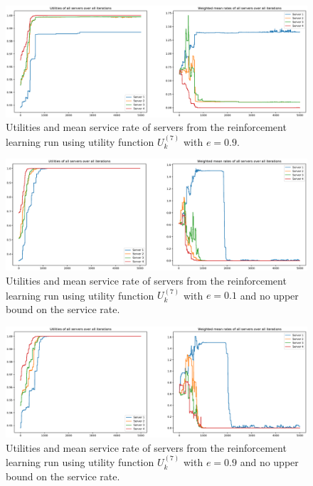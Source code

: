 \begin{figure}[H]
    \includegraphics[width=\textwidth]{chapters/00_appendix/03_more_rl_results/Bin/utility_7_eps/u7_4_e09.eps}
    \caption{Utilities and mean service rate of servers from the reinforcement
    learning run using utility function \(U_k^{(7)}\) with \(e = 0.9\).}
    \label{fig:RL_utility7_4_e09}
\end{figure}


\begin{figure}[H]
    \includegraphics[width=\textwidth]{chapters/00_appendix/03_more_rl_results/Bin/utility_7_eps/u7_5_no_max_e01.eps}
    \caption{Utilities and mean service rate of servers from the reinforcement
    learning run using utility function \(U_k^{(7)}\) with \(e = 0.1\) and no
    upper bound on the service rate.}
    \label{fig:RL_utility7_5_no_max_e01}
\end{figure}

\begin{figure}[H]
    \includegraphics[width=\textwidth]{chapters/00_appendix/03_more_rl_results/Bin/utility_7_eps/u7_5_no_max_e09.eps}
    \caption{Utilities and mean service rate of servers from the reinforcement
    learning run using utility function \(U_k^{(7)}\) with \(e = 0.9\) and no
    upper bound on the service rate.}
    \label{fig:RL_utility7_5_no_max_e09}
\end{figure}


